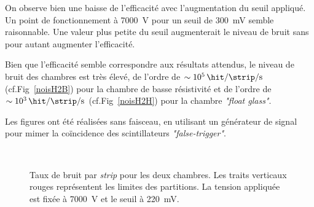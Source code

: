 On observe bien une baisse de l'efficacité avec l'augmentation du seuil appliqué. Un point de fonctionnement à \SI{7000}{\volt} pour un seuil de \SI{300}{\milli\volt} semble raisonnable. Une valeur plus petite du seuil augmenterait le niveau de bruit sans pour autant augmenter l'efficacité.

Bien que l'efficacité semble correspondre aux résultats attendus, le niveau de bruit des chambres est très élevé, de l'ordre de $\sim\SI{e5}{\hit\per\strip\per\second}$ (cf.Fig~\ref{noisH2B}) pour la chambre de basse résistivité et de l'ordre de $\sim\SI{e3}{\hit\per\strip\per\second}$ (cf.Fig~\ref{noisH2H}) pour la chambre \textit{"float glass"}. 

Les figures ont été réalisées sans faisceau, en utilisant un générateur de signal pour mimer la coïncidence des scintillateurs \textit{"false-trigger"}.
\vspace*{0.4cm}
\begin{figure}[ht!]
	\centering
	\\
	\vspace*{1.3cm}
	\caption{Taux de bruit par \textit{strip} pour les deux chambres. Les traits verticaux rouges représentent les limites des partitions. La tension appliquée est fixée à \SI{7000}{\volt} et le seuil à \SI{220}{\milli\volt}.}
\end{figure}

